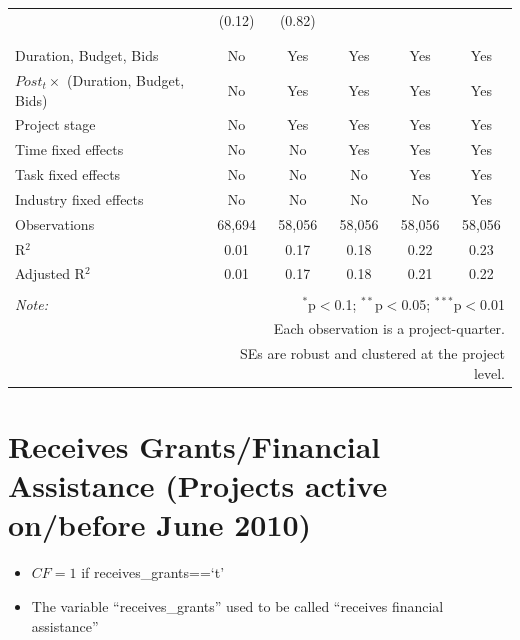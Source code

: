 \documentclass[
]{article}
\providecommand{\tightlist}{%
  \setlength{\itemsep}{0pt}\setlength{\parskip}{0pt}}
\begin{document}
\begin{table}[H]
\begin{tabular}{@{\extracolsep{-2pt}}lccccc}
  & (0.12) & (0.82) &  &  &  \\ 
  & & & & & \\ 
\hline \\[-1.8ex] 
Duration, Budget, Bids & No & Yes & Yes & Yes & Yes \\ 
$Post_t \times $  (Duration, Budget, Bids) & No & Yes & Yes & Yes & Yes \\ 
Project stage & No & Yes & Yes & Yes & Yes \\ 
Time fixed effects & No & No & Yes & Yes & Yes \\ 
Task fixed effects & No & No & No & Yes & Yes \\ 
Industry fixed effects & No & No & No & No & Yes \\ 
Observations & 68,694 & 58,056 & 58,056 & 58,056 & 58,056 \\ 
R$^{2}$ & 0.01 & 0.17 & 0.18 & 0.22 & 0.23 \\ 
Adjusted R$^{2}$ & 0.01 & 0.17 & 0.18 & 0.21 & 0.22 \\ 
\hline 
\hline \\[-1.8ex] 
\textit{Note:}  & \multicolumn{5}{r}{$^{*}$p$<$0.1; $^{**}$p$<$0.05; $^{***}$p$<$0.01} \\ 
 & \multicolumn{5}{r}{Each observation is a project-quarter.} \\ 
 & \multicolumn{5}{r}{SEs are robust and clustered at the project level.} \\ 
\end{tabular} 
\end{table}

\hypertarget{receives-grantsfinancial-assistance-projects-active-onbefore-june-2010}{%
\section{Receives Grants/Financial Assistance (Projects active on/before
June
2010)}\label{receives-grantsfinancial-assistance-projects-active-onbefore-june-2010}}

\begin{itemize}
\tightlist
\item
  \(CF=1\) if receives\_grants==`t'
\item
  The variable ``receives\_grants'' used to be called ``receives
  financial assistance''
\end{itemize}
\end{document}
